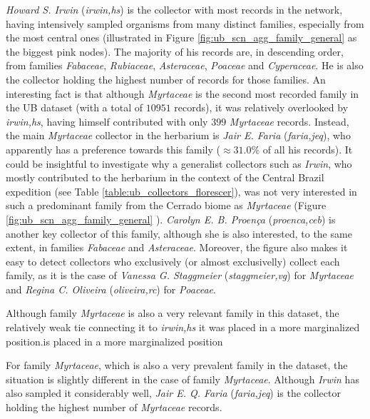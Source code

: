 \textit{Howard S. Irwin} (\textit{irwin,hs}) is the collector with most records in the network, having intensively sampled organisms from many distinct families, especially from the most central ones (illustrated in Figure \ref{fig:ub_scn_agg_family_general} as the biggest pink nodes).
The majority of his records are, in descending order, from families \textit{Fabaceae}, \textit{Rubiaceae}, \textit{Asteraceae}, \textit{Poaceae} and \textit{Cyperaceae}. He is also the collector holding the highest number of records for those families.
An interesting fact is that although \textit{Myrtaceae} is the second most recorded family in the UB dataset (with a total of $10951$ records), it was relatively overlooked by \textit{irwin,hs}, having himself contributed with only $399$ \textit{Myrtaceae} records. 
Instead, the main \textit{Myrtaceae} collector in the herbarium is \textit{Jair E. Faria} (\textit{faria,jeq}), who apparently has a preference towards this family ($\approx 31.0\%$ of all his records). 
It could be insightful to investigate why a generalist collectors such as \textit{Irwin}, who mostly contributed to the herbarium in the context of the Central Brazil expedition (see Table \ref{table:ub_collectors_florescer}), was not very interested in such a predominant family from the Cerrado biome as \textit{Myrtaceae} (Figure \ref{fig:ub_scn_agg_family_general} ).
\textit{Carolyn E. B. Proença} (\textit{proenca,ceb}) is another key collector of this family, although she is also interested, to the same extent, in families \textit{Fabaceae} and \textit{Asteraceae}. 
Moreover, the figure also makes it easy to detect collectors who exclusively (or almost exclusivelly) collect each family, as it is the case of \textit{Vanessa G. Staggmeier} (\textit{staggmeier,vg}) for \textit{Myrtaceae} and \textit{Regina C. Oliveira} (\textit{oliveira,rc}) for \textit{Poaceae}.




Although family \textit{Myrtaceae} is also a very relevant family in this dataset, the relatively weak tie connecting it to \textit{irwin,hs} 
it was placed in a more marginalized position.is placed in a more marginalized position

For family \textit{Myrtaceae}, which is also a very prevalent family in the dataset, the situation is slightly different in the case of family \textit{Myrtaceae}. Although \textit{Irwin} has also sampled it considerably well, \textit{Jair E. Q. Faria} (\textit{faria,jeq}) is the collector holding the highest number of \textit{Myrtaceae} records.

